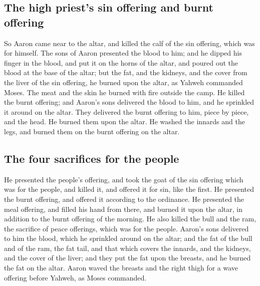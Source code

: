 \hypertarget{the-high-priests-sin-offering-and-burnt-offering}{%
\subsection{The high priest's sin offering and burnt
offering}\label{the-high-priests-sin-offering-and-burnt-offering}}

 So Aaron came near to the altar, and killed the calf of
the sin offering, which was for himself.  The sons of
Aaron presented the blood to him; and he dipped his finger in the blood,
and put it on the horns of the altar, and poured out the blood at the
base of the altar;  but the fat, and the kidneys, and the
cover from the liver of the sin offering, he burned upon the altar, as
Yahweh commanded Moses.  The meat and the skin he burned
with fire outside the camp.  He killed the burnt
offering; and Aaron's sons delivered the blood to him, and he sprinkled
it around on the altar.  They delivered the burnt
offering to him, piece by piece, and the head. He burned them upon the
altar.  He washed the innards and the legs, and burned
them on the burnt offering on the altar.

\hypertarget{the-four-sacrifices-for-the-people}{%
\subsection{The four sacrifices for the
people}\label{the-four-sacrifices-for-the-people}}

 He presented the people's offering, and took the goat of
the sin offering which was for the people, and killed it, and offered it
for sin, like the first.  He presented the burnt
offering, and offered it according to the ordinance.  He
presented the meal offering, and filled his hand from there, and burned
it upon the altar, in addition to the burnt offering of the morning.
 He also killed the bull and the ram, the sacrifice of
peace offerings, which was for the people. Aaron's sons delivered to him
the blood, which he sprinkled around on the altar;  and
the fat of the bull and of the ram, the fat tail, and that which covers
the innards, and the kidneys, and the cover of the liver;
 and they put the fat upon the breasts, and he burned the
fat on the altar.  Aaron waved the breasts and the right
thigh for a wave offering before Yahweh, as Moses commanded.

